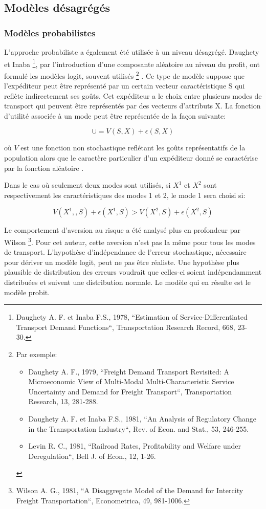 \subsection{Mod\`eles d\'esagr\'eg\'es}

\subsubsection{Mod\`eles probabilistes}


L'approche probabiliste a également été utilisée à un niveau
désagrégé.
 Daughety et Inaba \footnote{Daughety A. F. et Inaba F.S., 1978,
``Estimation of Service-Differentiated Transport Demand
Functions``, Transportation Research Record, 668, 23-30.}, par
l'introduction d'une composante aléatoire au niveau du profit, ont
formulé les modèles logit, souvent utilisés
\footnote{Par exemple:
\begin{itemize}
\item Daughety A. F., 1979, ``Freight Demand Transport Revisited: A
Microeconomic View of Multi-Modal Multi-Characteristic Service
Uncertainty and Demand for Freight Transport``, Transportation
Research, 13, 281-288.
\item Daughety A. F. et Inaba F.S., 1981, ``An Analysis of Regulatory Change
in the Transportation Industry``, Rev. of Econ. and Stat., 53,
246-255.
\item Levin R. C., 1981, ``Railroad Rates, Profitability and Welfare under
Deregulation``, Bell J. of Econ., 12, 1-26.
\end{itemize}} . Ce type de modèle suppose que l'expéditeur peut être représenté
par un certain vecteur caractéristique S qui reflète indirectement ses goûts.
Cet expéditeur a le choix entre plusieurs modes de transport qui peuvent être
représentés par des vecteurs d'attributs X. La fonction d'utilité associée à un
mode peut être représentée de la façon suivante:

$$\cup =V(S,X)+\epsilon (S,X)$$

où $V$ est une fonction non stochastique reflétant les goûts représentatifs de
la population alors que le caractère particulier d'un expéditeur donné se
caractérise par la fonction aléatoire .

Dans le cas où seulement deux modes sont utilisés, si $X^1$ et $X^2$ sont
respec\-tivement les caractéristiques des modes 1 et 2, le mode 1 sera choisi si:

$$V(X^1,,S)+\epsilon (X^1,S) > V(X^2,S) + \epsilon (X^2,S)$$


Le comportement d'aversion au risque a été analysé plus en profondeur par Wilson
\footnote{ Wilson A. G., 1981, ``A Disaggregate Model of the Demand for
Intercity Freight Transportation``, Econometrica, 49, 981-1006.}. Pour cet
auteur, cette aversion n'est pas la même pour tous les modes de transport.
L'hypothèse d'indépendance de l'erreur stochastique, nécessaire pour dériver un
modèle logit, peut ne pas être réaliste. Une hypothèse plus plausible de
distribution des erreurs voudrait que celles-ci soient indépendam\-ment
distribuées et suivent une distribution normale. Le modèle qui en résulte est le
modèle probit.


